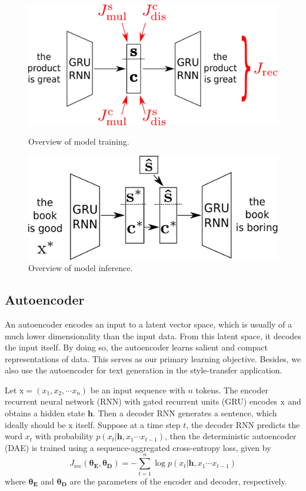 \documentclass[letterpaper]{article} %
\newcommand{\rmx}{\mathrm x}
\newcommand{\loss}[2]{J_{\text{#1}}^{\text{#2}}}
\newcommand{\nnweight}[2]{\bm{\theta_{\text{#1}}^{\text{#2}}}}
\begin{document}
\begin{figure}[ht]
	\centering
	\includegraphics[width=0.8\linewidth]{model-overview-training}
	\caption{Overview of model training.}
	\label{fig:model-training-overview}

	\includegraphics[width=0.8\linewidth]{model-overview-inference}
	\caption{Overview of model inference.}
	\label{fig:model-inference-overview}
\end{figure}

\subsection{Autoencoder} \label{ssec:seq2seq-autoencoder}

An autoencoder encodes an input to a latent vector space, which is usually of a much lower dimensionality than the input data.
From this latent space, it decodes the input itself.
By doing so, the autoencoder learns salient and compact representations of data.
This serves as our primary learning objective.
Besides, we also use the autoencoder for text generation in the style-transfer application.

Let $\rmx=(x_1, x_2, \cdots x_n)$ be an input sequence with $n$ tokens.
The encoder recurrent neural network (RNN) with gated recurrent units (GRU) \cite{cho2014learning} encodes $\rm x$ and obtains a hidden state $\bm h$.
Then a decoder RNN generates a sentence, which ideally should be $\rmx$ itself.
Suppose at a time step $t$, the decoder RNN predicts the word $x_t$ with probability $p(x_t|\bm h, x_1\cdots x_{t-1})$, then the deterministic autoencoder (DAE) is trained using a sequence-aggregated cross-entropy loss, given by
\begin{equation}
	\loss{rec}{}(\nnweight{E}{},\nnweight{D}{})= -\sum_{t=1}^n \log p(x_t|\bm h, x_1\cdots x_{t-1})
\end{equation}
where $\nnweight{E}{}$ and $\nnweight{D}{}$ are the parameters of the encoder and decoder, respectively.
\end{document}
